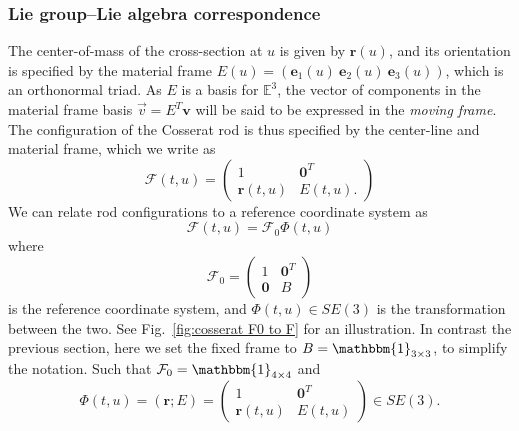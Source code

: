 \subsubsection*{Lie group–Lie algebra correspondence} \label{sec:Lie group–Lie algebra correspondence}

The center-of-mass of the cross-section at $u$ is given by $\mathbf{r}(u)$, and its orientation is specified by the material frame $E(u) = (\mathbf{e}_1(u)\ \mathbf{e}_2(u)\ \mathbf{e}_3(u))$, which is an orthonormal triad. As $E$ is a basis for $\mathbb{E}^3$, the vector of components in the material frame basis $\vec{v} = E^T \mathbf{v}$ will be said to be expressed in the \textit{moving frame}. The configuration of the Cosserat rod is thus specified by the center-line and material frame, which we write as
\begin{equation}
\mathcal{F}(t, u) = \begin{pmatrix}
1 & \mathbf{0}^T \\
\mathbf{r}(t, u) & E(t, u).
\end{pmatrix}
\end{equation}
We can relate rod configurations to a reference coordinate system as
\begin{equation} \label{eq:Cosserat rod from phi}
\mathcal{F}(t, u) = \mathcal{F}_0  \Phi(t, u)
\end{equation}
where
\begin{equation}
\mathcal{F}_0 = \begin{pmatrix}
1 & \mathbf{0}^T \\
\mathbf{0} & B
\end{pmatrix}
\end{equation}
is the reference coordinate system, and $\Phi(t,u) \in SE(3)$ is the transformation between the two. See Fig.~\ref{fig:cosserat F0 to F} for an illustration. In contrast the previous section, here we set the fixed frame to $B = \mathbbm{1}_{3 \times 3}$, to simplify the notation. Such that $\mathcal{F}_0 = \mathbbm{1}_{4 \times 4}$ and
\begin{equation} \label{eq:cosserat rod SE(3) state}
\Phi(t, u) = (\mathbf{r} ; E) = \begin{pmatrix}
1 & \mathbf{0}^T \\
\mathbf{r}(t,u) & E(t,u) 
\end{pmatrix} \in SE(3).
\end{equation}
